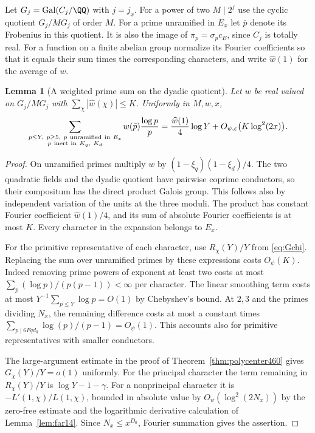 \documentclass[a4paper,11pt]{article}
\newtheorem{lemma}[proposition]{Lemma}
\theoremstyle{definition}
\theoremstyle{remark}
\numberwithin{equation}{section}
\begin{document}
Let \(G_j=\operatorname{Gal}(C_j/\QQ)\) with \(j=j_x\).
For a power of two \(M\mid 2^j\) use the cyclic quotient
\(G_j/MG_j\) of order \(M\). For a prime unramified in \(E_x\)
let \(\bar p\) denote its Frobenius in this quotient. It is also
the image of \(\pi_p=\sigma_pc_E\), since \(C_j\) is totally
real. For a function on a finite abelian group normalize its
Fourier coefficients so that it equals their sum times the
corresponding characters, and write \(\widehat w(1)\) for the
average of \(w\).

\begin{lemma}[A weighted prime sum on the dyadic quotient]\leavevmode
\label{lem:farprimedensity462}
Let \(w\) be real valued on \(G_j/MG_j\) with
\(\sum_\chi|\widehat w(\chi)|\le K\). Uniformly in \(M,w,x\),
\[
 \sum_{\substack{p\le Y,\ p\ge5,\ p\ {\rm unramified\ in}\ E_x\\
                       p\ {\rm inert\ in}\ K_q,\ K_d}}
                 w(\bar p)\frac{\log p}{p}
   =\frac{\widehat w(1)}4\log Y
                  +O_{\psi,\varepsilon}\bigl(K\log^2(2x)\bigr).
\]
\end{lemma}
\begin{proof}
On unramified primes multiply \(w\) by
\((1-\xi_q)(1-\xi_d)/4\). The two quadratic fields and the
dyadic quotient have pairwise coprime conductors, so their
compositum has the direct product Galois group. This follows
also by independent variation of the units at the three
moduli. The product has constant Fourier coefficient
\(\widehat w(1)/4\), and its sum of absolute Fourier
coefficients is at most \(K\). Every character in the
expansion belongs to \(E_x\).

For the primitive representative of each character, use
\(R_\chi(Y)/Y\) from \eqref{eq:Gchi}. Replacing the sum over
unramified primes by these expressions costs \(O_\psi(K)\).
Indeed removing prime powers of exponent at least two costs
at most \(\sum_p(\log p)/(p(p-1))<\infty\) per character.
The linear smoothing term costs at most
\(Y^{-1}\sum_{p\le Y}\log p=O(1)\) by Chebyshev's bound.
At \(2,3\) and the primes dividing \(N_x\), the remaining
difference costs at most a constant times
\(\sum_{p\mid 6Fqd_0}\log(p)/(p-1)=O_\psi(1)\).
This accounts also for primitive representatives with smaller
conductors.

The large-argument estimate in the proof of
Theorem~\ref{thm:polycenter460} gives \(G_\chi(Y)/Y=o(1)\)
uniformly. For the principal character the term remaining in
\(R_\chi(Y)/Y\) is \(\log Y-1-\gamma\). For a nonprincipal
character it is \(-L'(1,\chi)/L(1,\chi)\), bounded in absolute
value by \(O_\psi(\log^2(2N_x))\) by the zero-free estimate
and the logarithmic derivative calculation of
Lemma~\ref{lem:far14}. Since \(N_x\le x^{D_0}\), Fourier
summation gives the assertion.
\end{proof}
\end{document}
